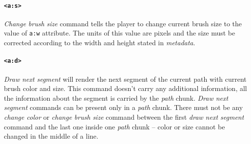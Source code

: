 \paragraph{\texttt{\textless a:s\textgreater}}
\textit{Change brush size} command tells the player to change current brush size to the value of \verb|a:w| attribute. The units of this value are pixels and the size must be corrected according to the width and height stated in \textit{metadata}.

\paragraph{\texttt{\textless a:d\textgreater}}
\textit{Draw next segment} will render the next segment of the current path with current brush color and size. This command doesn't carry any additional information, all the information about the segment is carried by the \textit{path} chunk. \textit{Draw next segment} commands can be present only in a \textit{path} chunk. There must not be any \textit{change color} or \textit{change brush size} command between the first \textit{draw next segment} command and the last one inside one \textit{path} chunk -- color or size cannot be changed in the middle of a line.